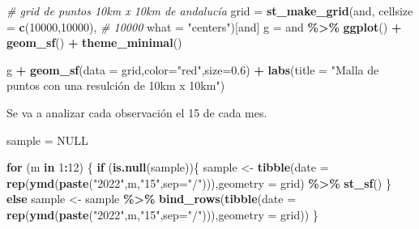 \documentclass[12pt,a4paper,]{book}
\newenvironment{Shaded}{\begin{snugshade}}{\end{snugshade}}
\newcommand{\AttributeTok}[1]{\textcolor[rgb]{0.13,0.29,0.53}{#1}}
\newcommand{\CommentTok}[1]{\textcolor[rgb]{0.56,0.35,0.01}{\textit{#1}}}
\newcommand{\ConstantTok}[1]{\textcolor[rgb]{0.56,0.35,0.01}{#1}}
\newcommand{\ControlFlowTok}[1]{\textcolor[rgb]{0.13,0.29,0.53}{\textbf{#1}}}
\newcommand{\DecValTok}[1]{\textcolor[rgb]{0.00,0.00,0.81}{#1}}
\newcommand{\FloatTok}[1]{\textcolor[rgb]{0.00,0.00,0.81}{#1}}
\newcommand{\FunctionTok}[1]{\textcolor[rgb]{0.13,0.29,0.53}{\textbf{#1}}}
\newcommand{\NormalTok}[1]{#1}
\newcommand{\OtherTok}[1]{\textcolor[rgb]{0.56,0.35,0.01}{#1}}
\newcommand{\SpecialCharTok}[1]{\textcolor[rgb]{0.81,0.36,0.00}{\textbf{#1}}}
\newcommand{\StringTok}[1]{\textcolor[rgb]{0.31,0.60,0.02}{#1}}
\numberwithin{dummy}{section}
\theoremstyle{ocrenumbox}
\theoremstyle{blacknumex}
\theoremstyle{blacknumbox}
\theoremstyle{ocrenum}
\theoremstyle{ocrenum}
\begin{document}
\begin{Shaded}
\begin{Highlighting}[]
\CommentTok{\# grid de puntos 10km x 10km de andalucía}
\NormalTok{grid }\OtherTok{=} \FunctionTok{st\_make\_grid}\NormalTok{(and,}
                    \AttributeTok{cellsize =} \FunctionTok{c}\NormalTok{(}\DecValTok{10000}\NormalTok{,}\DecValTok{10000}\NormalTok{), }\CommentTok{\# 10000}
                    \AttributeTok{what =} \StringTok{"centers"}\NormalTok{)[and]}
\NormalTok{g }\OtherTok{=}\NormalTok{ and }\SpecialCharTok{\%\textgreater{}\%} 
  \FunctionTok{ggplot}\NormalTok{() }\SpecialCharTok{+}
  \FunctionTok{geom\_sf}\NormalTok{() }\SpecialCharTok{+}
  \FunctionTok{theme\_minimal}\NormalTok{()}
 
\NormalTok{g }\SpecialCharTok{+} 
  \FunctionTok{geom\_sf}\NormalTok{(}\AttributeTok{data =}\NormalTok{ grid,}\AttributeTok{color=}\StringTok{"red"}\NormalTok{,}\AttributeTok{size=}\FloatTok{0.6}\NormalTok{) }\SpecialCharTok{+}
  \FunctionTok{labs}\NormalTok{(}\AttributeTok{title =} \StringTok{"Malla de puntos con una resulción de 10km x 10km"}\NormalTok{)}
\end{Highlighting}
\end{Shaded}

Se va a analizar cada observación el 15 de cada mes.

\begin{Shaded}
\begin{Highlighting}[]
\NormalTok{sample }\OtherTok{=} \ConstantTok{NULL}

\ControlFlowTok{for}\NormalTok{ (m }\ControlFlowTok{in} \DecValTok{1}\SpecialCharTok{:}\DecValTok{12}\NormalTok{) \{}
  \ControlFlowTok{if}\NormalTok{ (}\FunctionTok{is.null}\NormalTok{(sample))\{}
\NormalTok{    sample }\OtherTok{\textless{}{-}} \FunctionTok{tibble}\NormalTok{(}\AttributeTok{date =} \FunctionTok{rep}\NormalTok{(}\FunctionTok{ymd}\NormalTok{(}\FunctionTok{paste}\NormalTok{(}\StringTok{"2022"}\NormalTok{,m,}\StringTok{"15"}\NormalTok{,}\AttributeTok{sep=}\StringTok{"/"}\NormalTok{))),}\AttributeTok{geometry =}\NormalTok{ grid) }\SpecialCharTok{\%\textgreater{}\%} \FunctionTok{st\_sf}\NormalTok{()}
\NormalTok{  \} }\ControlFlowTok{else}
\NormalTok{  sample }\OtherTok{\textless{}{-}}\NormalTok{ sample }\SpecialCharTok{\%\textgreater{}\%} 
    \FunctionTok{bind\_rows}\NormalTok{(}\FunctionTok{tibble}\NormalTok{(}\AttributeTok{date =} \FunctionTok{rep}\NormalTok{(}\FunctionTok{ymd}\NormalTok{(}\FunctionTok{paste}\NormalTok{(}\StringTok{"2022"}\NormalTok{,m,}\StringTok{"15"}\NormalTok{,}\AttributeTok{sep=}\StringTok{"/"}\NormalTok{))),}\AttributeTok{geometry =}\NormalTok{ grid))}
\NormalTok{\}}
\end{Highlighting}
\end{Shaded}
\end{document}
